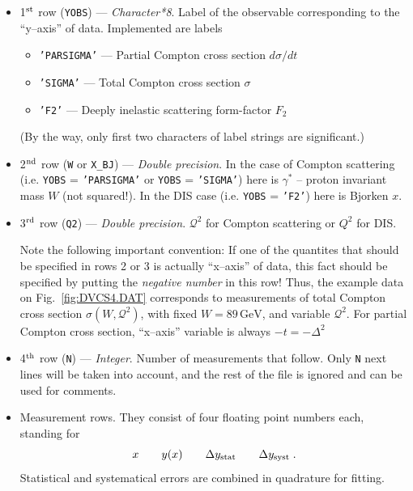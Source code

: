 \documentclass[12pt]{article}
\newcounter{comment}
\begin{document}
\begin{itemize}
\item 
1$^{\rm st}$ row (\texttt{YOBS}) --- \emph{Character*8}. Label of the observable
corresponding to the ``y--axis'' of data. Implemented are labels
  \begin{itemize}
  \item \texttt{'PARSIGMA'} --- Partial Compton cross section $d\sigma/d t$  
  \item \texttt{'SIGMA'} --- Total Compton cross section $\sigma$  
  \item \texttt{'F2'} --- Deeply inelastic scattering form-factor $F_2$  
  \end{itemize} 
(By the way, only first two characters of label strings are significant.)


\item 
2$^{\rm nd}$ row (\texttt{W} or \texttt{X\_BJ}) --- \emph{Double precision}.
In the case of Compton scattering (i.e. \texttt{YOBS} = \texttt{'PARSIGMA'} or
\texttt{YOBS} = \texttt{'SIGMA'}) here is $\gamma^*$ -- proton invariant mass
$W$ (not squared!). In the DIS case (i.e. \texttt{YOBS} = \texttt{'F2'})
here is Bjorken $x$.

\item 
3$^{\rm rd}$ row (\texttt{Q2}) --- \emph{Double precision}. $\mathcal{Q}^2$
for Compton scattering or $Q^2$ for DIS.

Note the following important convention: If one of the quantites that should
be specified in rows 2 or 3 is actually ``x--axis'' of data, this fact
should be specified by putting the \emph{negative number} in this row!
Thus, the example data on Fig.~\ref{fig:DVCS4.DAT} corresponds to
measurements of total Compton cross section $\sigma(W, \mathcal{Q}^2)$, with
fixed $W = 89\, \textrm{GeV}$, and variable $\mathcal{Q}^2$.
For partial Compton cross section, ``x--axis'' variable is 
always $-t = - \Delta^2$

\item 
4$^{\rm th}$ row (\texttt{N}) --- \emph{Integer}. Number of measurements that
follow. Only \texttt{N} next lines will be taken into account, and the
rest of the file is ignored and can be used for comments.

\item
Measurement rows. They consist of four floating point numbers each,
standing for 
\[
 x \qquad y(x) \qquad \Delta y_{\rm stat} \qquad
\Delta y_{\rm syst} \;.
\]
Statistical and systematical errors are combined in quadrature for fitting.

\end{itemize}
\end{document}
